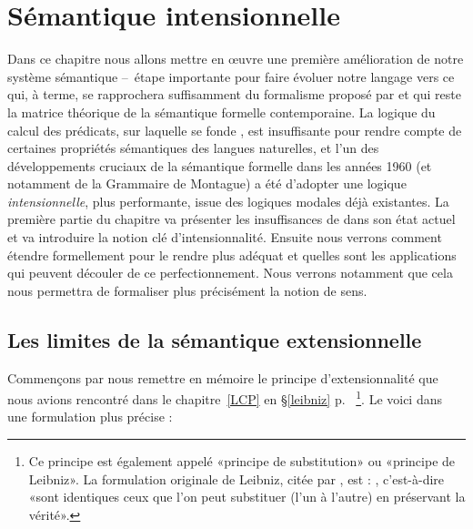 \chapter{Sémantique intensionnelle}
\label{Ch:t+m}



Dans ce chapitre nous allons mettre en \oe uvre  une première amélioration de notre système sémantique --~étape importante pour faire évoluer notre langage {\LO} vers ce qui, à terme, se rapprochera suffisamment du formalisme proposé par \citet[entre autres]{PTQ} et qui reste la matrice théorique de la sémantique formelle contemporaine.
La logique du calcul des prédicats, sur laquelle se fonde {\LO}, est insuffisante pour rendre compte de certaines propriétés sémantiques des langues naturelles, et l'un des développements cruciaux de la sémantique formelle dans les années 1960 (et notamment de la Grammaire de Montague) a été d'adopter une logique \emph{intensionnelle}, plus performante, issue des logiques modales déjà existantes. 
La première partie du chapitre va présenter les insuffisances de {\LO} dans son état actuel et va introduire la notion clé d'intensionnalité.  Ensuite nous verrons comment étendre formellement {\LO} pour le rendre plus adéquat et quelles sont les applications qui peuvent découler de ce perfectionnement. Nous verrons notamment que cela nous permettra de formaliser plus précisément la notion de sens. 



\section{Les limites de la sémantique extensionnelle}
\label{s:limitesExt}

Commençons par nous remettre en mémoire le principe d'extensionnalité que nous avions rencontré dans le chapitre~\ref{LCP} en
\S\ref{leibniz} p.~\pageref{leibniz}%
\footnote{Ce principe est également appelé «principe de substitution» ou «principe de Leibniz». La formulation originale de Leibniz, citée par
  \citet{Frege:SuB}, est : , c'est-à-dire «sont identiques ceux que l'on
  peut substituer (l'un à l'autre) en préservant la vérité».}.
Le voici dans une formulation plus précise :

